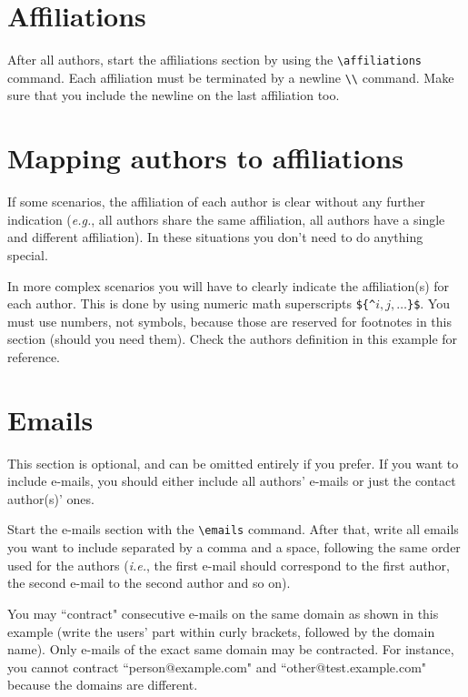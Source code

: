 \documentclass{article}
\begin{document}
\section{Affiliations}

After all authors, start the affiliations section by using the {\tt \textbackslash{}affiliations} command.
Each affiliation must be terminated by a newline {\tt \textbackslash{}\textbackslash{}} command. Make sure that you include the newline on the last affiliation too.

\section{Mapping authors to affiliations}

If some scenarios, the affiliation of each author is clear without any further indication (\emph{e.g.}, all authors share the same affiliation, all authors have a single and different affiliation). In these situations you don't need to do anything special.

In more complex scenarios you will have to clearly indicate the affiliation(s) for each author. This is done by using numeric math superscripts {\tt \$\{\^{}$i,j, \ldots$\}\$}. You must use numbers, not symbols, because those are reserved for footnotes in this section (should you need them). Check the authors definition in this example for reference.

\section{Emails}

This section is optional, and can be omitted entirely if you prefer. If you want to include e-mails, you should either include all authors' e-mails or just the contact author(s)' ones.

Start the e-mails section with the {\tt \textbackslash{}emails} command. After that, write all emails you want to include separated by a comma and a space, following the same order used for the authors (\emph{i.e.}, the first e-mail should correspond to the first author, the second e-mail to the second author and so on).

You may ``contract" consecutive e-mails on the same domain as shown in this example (write the users' part within curly brackets, followed by the domain name). Only e-mails of the exact same domain may be contracted. For instance, you cannot contract ``person@example.com" and ``other@test.example.com" because the domains are different.


\end{document}
